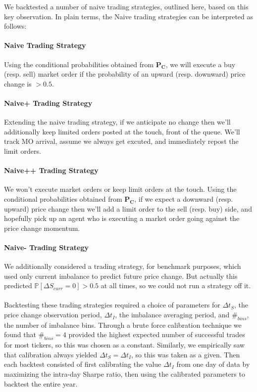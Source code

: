 \documentclass[12pt]{article}
\newcommand\mat[1]{\boldsymbol{#1}}
\begin{document}
We backtested a number of naive trading strategies, outlined here, based on this key observation. In plain terms, the Naive trading strategies can be interpreted as follows:

\paragraph{Naive Trading Strategy}  Using the conditional probabilities obtained from $\mat{P_C}$, we will execute a buy (resp. sell) market order if the probability of an upward (resp. downward) price change is $> 0.5$.

\paragraph{Naive+ Trading Strategy} Extending the naive trading strategy, if we anticipate no change then we'll additionally keep limited orders posted at the touch, front of the queue. We'll track MO arrival, assume we always get excuted, and immediately repost the limit orders.

\paragraph{Naive++ Trading Strategy} We won't execute market orders or keep limit orders at the touch. Using the conditional probabilities obtained from $\mat{P_C}$, if we expect a downward (resp. upward) price change then we'll add a limit order to the sell (resp. buy) side, and hopefully pick up an agent who is executing a market order going against the price change momentum. 

\paragraph{Naive- Trading Strategy} We additionally considered a trading strategy, for benchmark purposes, which used only current imbalance to predict future price change. But actually this predicted $\mathbb{P} \left[ \Delta S_{curr} = 0 \right] > 0.5$ at all times, so we could not run a strategy off it. \\ \\
Backtesting these trading strategies required a choice of parameters for $\Delta t_S$, the price change observation period, $\Delta t_I$, the imbalance averaging period, and $\#_{bins}$, the number of imbalance bins. Through a brute force calibration technique we found that $\#_{bins} = 4$ provided the highest expected number of successful trades for most tickers, so this was chosen as a constant. Similarly, we empirically saw that calibration always yielded $\Delta t_S = \Delta t_I$, so this was taken as a given. Then each backtest consisted of first calibrating the value $\Delta t_I$ from one day of data by maximizing the intra-day Sharpe ratio, then using the calibrated parameters to backtest the entire year.
\end{document}
